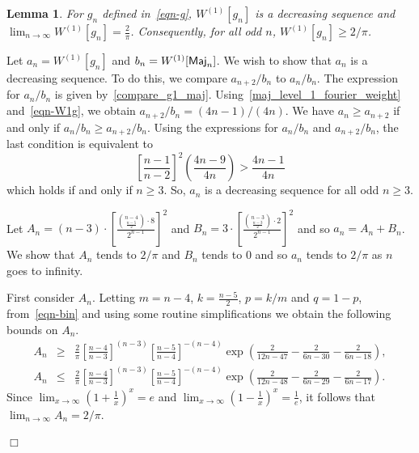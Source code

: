 \documentclass[11pt]{article}
\newtheorem{lemma} {Lemma}
\newenvironment{proof}{\noindent{\bf Proof:}\indent}%
                      {\hfill $\Box$\par}
\newcommand{\sym}[1]{{\sf #1}}
\begin{document}
\begin{lemma}\label{our_lemma_4}
	For $g_n$ defined in~\eqref{eqn-g}, ${W}^{(1)}[g_n]$ is a decreasing sequence and $\lim_{n\to\infty}{W}^{(1)}[g_n]=\frac{2}{\pi}$.
	Consequently, for all odd $n$, ${W}^{(1)}[g_n]\geq 2/\pi$.
\end{lemma}
\begin{proof}
	Let $a_n={W}^{(1)}[g_{n}]$ and $b_n={W}^{(1)}[\sym{Maj}_n]$. We wish to show that $a_n$ is a decreasing sequence. 
	To do this, we compare $a_{n+2}/b_n$ to $a_n/b_n$. The expression for $a_n/b_n$ is given by~\eqref{compare_g1_maj}. Using~\eqref{maj_level_1_fourier_weight} 
	and~\eqref{eqn-W1g}, we obtain $a_{n+2}/b_n=(4n-1)/(4n)$. We have $a_n \geq a_{n+2}$ if and only if $a_n/b_n\geq a_{n+2}/b_n$. 
	Using the expressions for $a_n/b_n$ and $a_{n+2}/b_n$, the last condition is equivalent to 
$$	
\left[\frac{n-1}{n-2}\right]^2\left(\frac{4n-9}{4n}\right) > \frac{4n-1}{4n}
$$
which holds if and only if $n\geq 3$. So, $a_n$ is a decreasing sequence for all odd $n\geq 3$. 


Let $A_n=(n-3)\cdot\left[\frac{{n-4\choose \frac{n-5}{2}}\cdot 8 }{2^{n-1}}\right]^2$ and $B_n=3\cdot\left[\frac{{n-3\choose \frac{n-3}{2}}\cdot 2}{2^{n-1}}\right]^2$ 
and so $a_n=A_n+B_n$. We show that $A_n$ tends to $2/\pi$ and $B_n$ tends to $0$ and so $a_n$ tends to $2/\pi$ as $n$ goes to infinity.
	
	First consider $A_n$. Letting $m=n-4$, $k=\frac{n-5}{2}$, $p=k/m$ and $q=1-p$, from~\eqref{eqn-bin} and using some routine simplifications
	we obtain the following bounds on $A_n$. 
\begin{eqnarray*}
	A_n & \geq & \frac{2}{\pi}\left[\frac{n-4}{n-3}\right]^{(n-3)}\left[\frac{n-5}{n-4}\right]^{-(n-4)}\exp\left(\frac{2}{12n-47}-\frac{2}{6n-30}-\frac{2}{6n-18}\right), \\
	A_n & \leq & \frac{2}{\pi}\left[\frac{n-4}{n-3}\right]^{(n-3)}\left[\frac{n-5}{n-4}\right]^{-(n-4)}\exp\left(\frac{2}{12n-48}-\frac{2}{6n-29}-\frac{2}{6n-17}\right).
\end{eqnarray*}
Since $\lim_{x\to\infty}(1+\frac{1}{x})^x=e$ and $\lim_{x\to\infty}(1-\frac{1}{x})^x=\frac{1}{e}$, it follows that $\lim_{n\to\infty}A_n=2/\pi$.


\end{proof}
\end{document}
